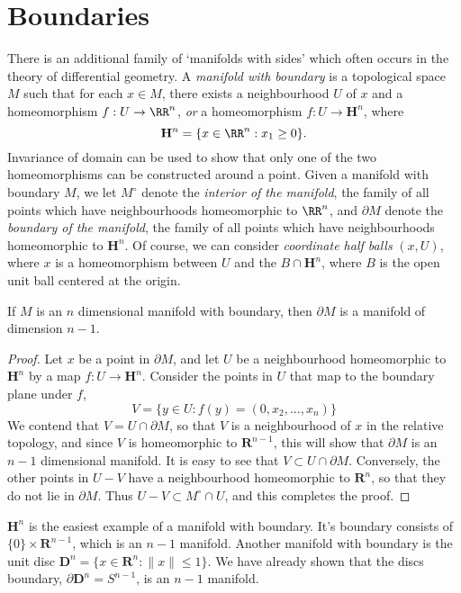 \section{Boundaries}

There is an additional family of `manifolds with sides' which often occurs in the theory of differential geometry. A \emph{manifold with boundary} is a topological space $M$ such that for each $x \in M$, there exists a neighbourhood $U$ of $x$ and a homeomorphism $f:U \to \RR^n$, \emph{or} a homeomorphism $f: U \to \mathbf{H}^n$, where
%
\[ \mathbf{H}^n = \{ x \in \RR^n: x_1 \geq 0 \}. \]
%
Invariance of domain can be used to show that only one of the two homeomorphisms can be constructed around a point. Given a manifold with boundary $M$, we let $M^\circ$ denote the \emph{interior of the manifold}, the family of all points which have neighbourhoods homeomorphic to $\RR^n$, and $\partial M$ denote the \emph{boundary of the manifold}, the family of all points which have neighbourhoods homeomorphic to $\mathbf{H}^n$. Of course, we can consider \emph{coordinate half balls} $(x,U)$, where $x$ is a homeomorphism between $U$ and the $B \cap \mathbf{H}^n$, where $B$ is the open unit ball centered at the origin.

\begin{theorem}
    If $M$ is an $n$ dimensional manifold with boundary, then $\partial M$ is a manifold of dimension $n-1$.
\end{theorem}
\begin{proof}
    Let $x$ be a point in $\partial M$, and let $U$ be a neighbourhood homeomorphic to $\mathbf{H}^n$ by a map $f:U \to \mathbf{H}^n$. Consider the points in $U$ that map to the boundary plane under $f$,
    \[ V = \{ y \in U : f(y) = (0,x_2, \dots, x_n) \} \]
    We contend that $V = U \cap \partial M$, so that $V$ is a neighbourhood of $x$ in the relative topology, and since $V$ is homeomorphic to $\mathbf{R}^{n-1}$, this will show that $\partial M$ is an $n-1$ dimensional manifold. It is easy to see that $V \subset U \cap \partial M$. Conversely, the other points in $U - V$ have a neighbourhood homeomorphic to $\mathbf{R}^n$, so that they do not lie in $\partial M$. Thus $U - V \subset M^\circ \cap U$, and this completes the proof.
\end{proof}

\begin{example}
    $\mathbf{H}^n$ is the easiest example of a manifold with boundary. It's boundary consists of $\{ 0 \} \times \mathbf{R}^{n-1}$, which is an $n - 1$ manifold. Another manifold with boundary is the unit disc $\mathbf{D}^n = \{ x \in \mathbf{R}^n : \|x\| \leq 1 \}$. We have already shown that the discs boundary, $\partial \mathbf{D}^n = S^{n-1}$, is an $n - 1$ manifold.
\end{example}

